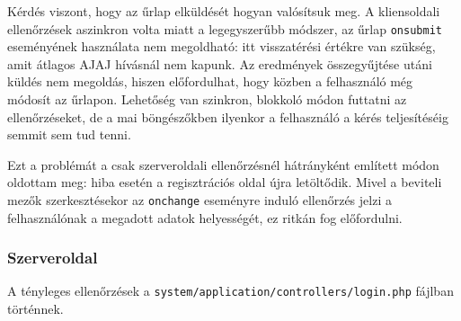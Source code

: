 \documentclass[12pt,a4paper,twoside]{article}
\begin{document}
Kérdés viszont, hogy az űrlap elküldését hogyan valósítsuk meg.
A kliensoldali ellenőrzések aszinkron volta miatt a legegyszerűbb módszer, az
űrlap \texttt{onsubmit} eseményének használata nem megoldható: itt visszatérési
értékre van szükség, amit átlagos AJAJ hívásnál nem kapunk. Az eredmények
összegyűjtése utáni küldés nem megoldás, hiszen előfordulhat, hogy közben a
felhasználó még módosít az űrlapon. Lehetőség van szinkron, blokkoló módon
futtatni az ellenőrzéseket, de a mai böngészőkben ilyenkor a felhasználó a kérés
teljesítéséig semmit sem tud tenni.

Ezt a problémát a csak szerveroldali ellenőrzésnél hátrányként említett módon
oldottam meg: hiba esetén a regisztrációs oldal újra letöltődik. Mivel a
beviteli mezők szerkesztésekor az \texttt{onchange} eseményre induló ellenőrzés
jelzi a felhasználónak a megadott adatok helyességét, ez ritkán fog előfordulni.

\subsubsection{Szerveroldal}

A tényleges ellenőrzések a \texttt{system/application/controllers/login.php}
fájlban történnek.
\end{document}
